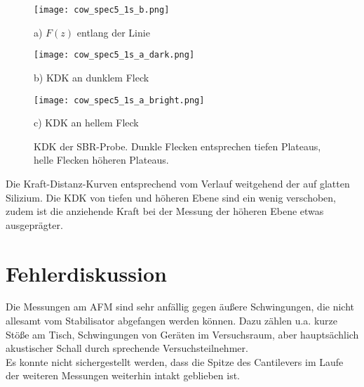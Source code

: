 \begin{figure}[H]
\centering
	\begin{minipage}{0.32\textwidth}
	\centering
		\texttt{[image: cow\_spec5\_1s\_b.png]}
		\caption*{a) $F(z)$ entlang der Linie}	
	\end{minipage}
	\hfill
		\begin{minipage}{0.28\textwidth}
		\centering
		\texttt{[image: cow\_spec5\_1s\_a\_dark.png]}
		\caption*{\!b) KDK an dunklem Fleck\!\!}	
	\end{minipage}
	\hfill
	\begin{minipage}{0.28\textwidth}
	\centering
		\texttt{[image: cow\_spec5\_1s\_a\_bright.png]}
		\caption*{c) KDK an hellem Fleck}	
	\end{minipage}
	\caption[Kraft-Distanz-Kurve der SBR-Probe]{KDK der SBR-Probe. \glqq Dunkle Flecken\grqq{} entsprechen tiefen Plateaus, \glqq helle Flecken\grqq{} höheren Plateaus.}
	\label{fig:cow_spec}
\end{figure}
Die Kraft-Distanz-Kurven entsprechend vom Verlauf weitgehend der auf glatten Silizium. Die KDK von tiefen und höheren Ebene sind ein wenig verschoben, zudem ist die anziehende Kraft bei der Messung der höheren Ebene etwas ausgeprägter.
\section{Fehlerdiskussion}
Die Messungen am AFM sind sehr anfällig gegen äußere Schwingungen, die nicht allesamt vom Stabilisator abgefangen werden können. Dazu zählen u.a. kurze Stöße am Tisch, Schwingungen von Geräten im Versuchsraum, aber hauptsächlich akustischer Schall durch sprechende Versuchsteilnehmer.\\
Es konnte nicht sichergestellt werden, dass die Spitze des Cantilevers im Laufe der weiteren Messungen weiterhin intakt geblieben ist.